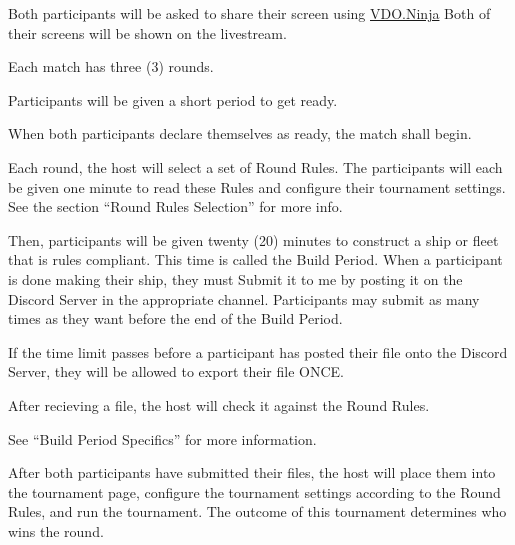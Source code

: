 \documentclass[11pt]{article}
\begin{document}
Both participants will be asked to share their screen using \href{https://vdo.ninja/}{VDO.Ninja}
Both of their screens will be shown on the livestream.

Each match has three (3) rounds.

Participants will be given a short period to get ready. 

When both participants declare themselves as ready, the match shall begin.

Each round, the host will select a set of Round Rules. The participants will each be given 
one minute to read these Rules and configure their tournament settings. See the section ``Round 
Rules Selection'' for more info.

Then, participants will be given twenty (20) minutes to construct a ship or fleet that is rules
compliant.
This time is called the Build Period.
When a participant is done making their ship, they must Submit it to me by posting it on the 
Discord Server in the appropriate channel. Participants may submit as many times as they want
before the end of the Build Period.

If the time limit passes before a participant has posted their file onto the Discord Server, they 
will be allowed to export their file ONCE.

After recieving a file, the host will check it against the Round Rules.

See ``Build Period Specifics'' for more information.

After both participants have submitted their files, the host will place them into the tournament 
page, configure the tournament settings according to the Round Rules, and run the tournament. The 
outcome of this tournament determines who wins the round.
\end{document}
